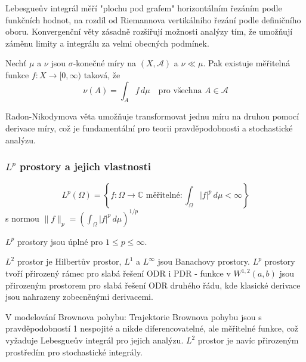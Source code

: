 \begin{intuition}
Lebesgueův integrál měří "plochu pod grafem" horizontálním řezáním podle funkčních hodnot, na rozdíl od Riemannova vertikálního řezání podle definičního oboru. Konvergenční věty zásadně rozšiřují možnosti analýzy tím, že umožňují záměnu limity a integrálu za velmi obecných podmínek.
\end{intuition}

\begin{theorem}
Nechť $\mu$ a $\nu$ jsou $\sigma$-konečné míry na $(X,\mathcal{A})$ a $\nu \ll \mu$. Pak existuje měřitelná funkce $f: X \to [0,\infty)$ taková, že
\[
\nu(A) = \int_A f \, d\mu \quad \text{pro všechna } A \in \mathcal{A}
\]
\end{theorem}

\begin{keyinsight}
Radon-Nikodymova věta umožňuje transformovat jednu míru na druhou pomocí derivace míry, což je fundamentální pro teorii pravděpodobnosti a stochastické analýzu.
\end{keyinsight}

\subsubsection{$L^p$ prostory a jejich vlastnosti}

\begin{definition}[$L^p$ prostor]
\[
L^p(\Omega) = \left\{ f: \Omega \to \mathbb{C} \text{ měřitelné} : \int_\Omega |f|^p \, d\mu < \infty \right\}
\]
s normou $\|f\|_p = \left(\int_\Omega |f|^p \, d\mu\right)^{1/p}$
\end{definition}

\begin{theorem}
$L^p$ prostory jsou úplné pro $1 \leq p \leq \infty$.
\end{theorem}

\begin{keyinsight}
$L^2$ prostor je Hilbertův prostor, $L^1$ a $L^\infty$ jsou Banachovy prostory. $L^p$ prostory tvoří přirozený rámec pro slabá řešení ODR i PDR - funkce v $W^{1,2}(a,b)$ jsou přirozeným prostorem pro slabá řešení ODR druhého řádu, kde klasické derivace jsou nahrazeny zobecněnými derivacemi.
\end{keyinsight}

\begin{application}
V modelování Brownova pohybu: Trajektorie Brownova pohybu jsou s pravděpodobností 1 nespojité a nikde diferencovatelné, ale měřitelné funkce, což vyžaduje Lebesgueův integrál pro jejich analýzu. $L^2$ prostor je navíc přirozeným prostředím pro stochastické integrály.
\end{application}

